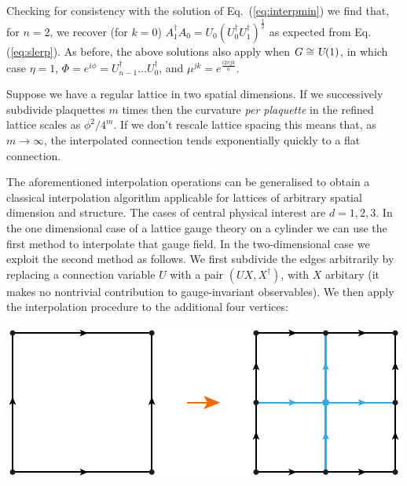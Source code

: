 \documentclass[twocolumn,lengthcheck,superscriptaddress]{revtex4-1}
\def\uone{\textsl{U}(1)}
\theoremstyle{definition}
\theoremstyle{remark}
\begin{document}
Checking for consistency with the solution of Eq.~(\ref{eq:interpmin}) we find that, for $n=2$, we recover (for $k=0$) $A_1^\dag A_0 = U_0(U_0^\dag U_1^\dag)^{\frac{1}{2}}$ as expected from Eq. (\ref{eq:slerp}). As before, the above solutions also apply when $G \cong \uone$, in which case $\eta = 1$, $\Phi = e^{i\phi} = U_{n-1}^\dag \dots U_0^\dag$, and $\mu^{jk} = e^{\frac{i2\pi jk}{n}}$. 

Suppose we have a regular lattice in two spatial dimensions. If we successively subdivide plaquettes $m$ times then the curvature \emph{per plaquette} in the refined lattice scales as $\phi^2/4^m$.  If we don't rescale lattice spacing this means that, as $m\rightarrow \infty$, the interpolated connection tends exponentially quickly to a flat connection.

The aforementioned interpolation operations can be generalised to obtain a classical interpolation algorithm applicable for lattices of arbitrary spatial dimension and structure. The cases of central physical interest are $d=1, 2, 3$. In the one dimensional case of a lattice gauge theory on a cylinder we can use the first method to interpolate that gauge field. In the two-dimensional case we exploit the second method as follows. We first subdivide the edges arbitrarily by replacing a connection variable $U$ with a pair $(UX, X^\dag)$, with $X$ arbitary (it makes no nontrivial contribution to gauge-invariant observables). We then apply the interpolation procedure to the additional four vertices:
\begin{center}
	\includegraphics{plaquettesubdivide.pdf}
\end{center}
\end{document}
